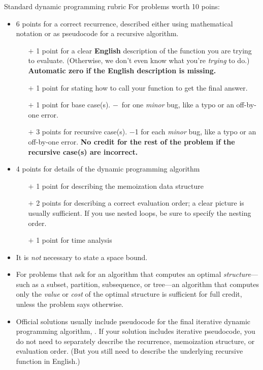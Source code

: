 \documentclass[11pt]{article}
\begin{document}
\begin{Rubric}{Standard dynamic programming rubric} For problems worth 10 poins:

\begin{itemize}
\item 6 points for a correct recurrence, described either using mathematical notation or as pseudocode for a recursive algorithm.
\begin{itemize}\cramped
\item[$+$]
1 point for a clear \textbf{English} description of the function you are trying to evaluate.  (Otherwise, we don’t even know what you’re \emph{trying} to do.)  \textbf{Automatic zero if the English description is missing.}
\item[$+$]
1 point for stating how to call your function to get the final answer.
\item[$+$]
1 point for base case(s).  $-$\textonehalf\ for one \emph{minor} bug, like a typo  or an off-by-one error.
\item[$+$]
3 points for recursive case(s).  $-$1 for each \emph{minor} bug, like a typo or an off-by-one error.  
\textbf{No credit for the rest of the problem if the recursive case(s) are incorrect.}
\end{itemize}
\item
4 points for details of the dynamic programming algorithm
\begin{itemize}\cramped
\item[$+$]
1 point for describing the memoization data structure
\item[$+$]
2 points for describing a correct evaluation order; a clear picture is usually sufficient.  If you use nested loops, be sure to specify the nesting order.
\item[$+$]
1 point for time analysis
\end{itemize}
\item
It is \emph{not} necessary to state a space bound.

\item
For problems that ask for an algorithm that computes an optimal \emph{structure}---such as a subset, partition, subsequence, or tree---an algorithm that computes only the \emph{value} or \emph{cost} of the optimal structure is sufficient for full credit, unless the problem says otherwise.

\item
Official solutions usually include pseudocode for the final iterative dynamic programming algorithm, .  If your solution includes iterative pseudocode, you do not need to separately describe the recurrence, memoization structure, or  evaluation order.  (But you still need to describe the underlying recursive function in English.)


\end{itemize}
\end{Rubric}
\end{document}
